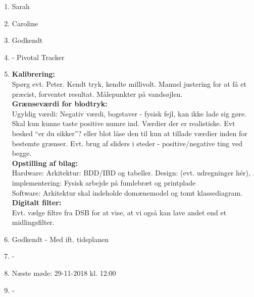 \begin{enumerate}
	\item Sarah
	\item Caroline
	\item Godkendt
	\item - Pivotal Tracker
	\item \textbf{Kalibrering:} \\
	Spørg evt. Peter. 
	Kendt tryk, kendte millivolt. Manuel justering for at få et præcist, forventet resultat. Målepunkter på vandsøjlen. \\
	\textbf{Grænseværdi for blodtryk: } \\
	Ugyldig værdi: Negativ værdi, bogstaver - fysisk fejl, kan ikke lade sig gøre. Skal kun kunne taste positive numre ind. Værdier der er realistiske. Evt besked “er du sikker”? eller blot låse den til kun at tillade værdier inden for bestemte grænser. Evt. brug af sliders i steder - positive/negative ting ved begge. \\
	\textbf{Opstilling af bilag:} \\
	Hardware: Arkitektur: BDD/IBD og tabeller. Design: (evt. udregninger hér), implementering: Fysisk arbejde på fumlebræt og printplade \\
	Software: Arkitektur skal indeholde domænemodel og tomt klassediagram. \\
	\textbf{Digitalt filter:} \\
	Evt. vælge filtre fra DSB for at vise, at vi også kan lave andet end et midlingsfilter. \\
	\item Godkendt - Med ift. tidsplanen
	\item - 
	\item Næste møde: 29-11-2018 kl. 12:00 
	\item -
	
\end{enumerate}

\clearpage